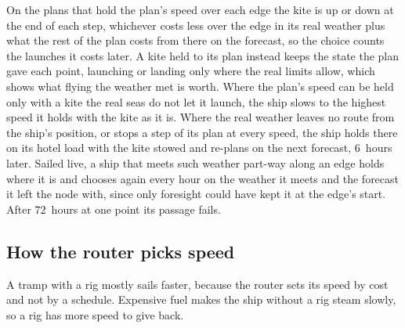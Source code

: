 On the plans that hold the plan's speed over each edge the kite is up or down at the end of each step, whichever costs less over the edge in its real weather plus what the rest of the plan costs from there on the forecast, so the choice counts the launches it costs later. A kite held to its plan instead keeps the state the plan gave each point, launching or landing only where the real limits allow, which shows what flying the weather met is worth. Where the plan's speed can be held only with a kite the real seas do not let it launch, the ship slows to the highest speed it holds with the kite as it is. Where the real weather leaves no route from the ship's position, or stops a step of its plan at every speed, the ship holds there on its hotel load with the kite stowed and re-plans on the next forecast, 6~hours later. Sailed live, a ship that meets such weather part-way along an edge holds where it is and chooses again every hour on the weather it meets and the forecast it left the node with, since only foresight could have kept it at the edge's start. After 72~hours at one point its passage fails. 

\subsection{How the router picks speed}
\label{app:speed_choice}
\label{sec:res_speed}

A tramp with a rig mostly sails faster, because the router sets its speed by cost and not by a schedule.  Expensive fuel makes the ship without a rig steam slowly, so a rig has more speed to give back.

